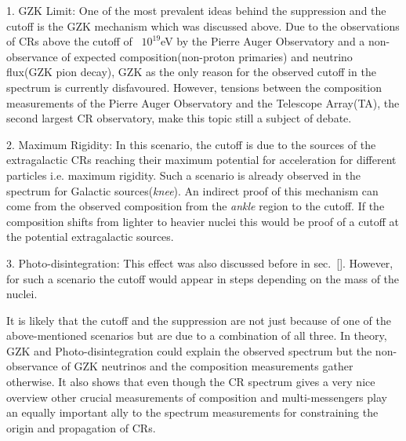 1. GZK Limit: One of the most prevalent ideas behind the suppression and the cutoff is the GZK mechanism which was discussed above. Due to the observations of CRs above the cutoff of ~$10^{19}$eV by the Pierre Auger Observatory and a non-observance of expected composition(non-proton primaries) and neutrino flux(GZK pion decay), GZK as the only reason for the observed cutoff in the spectrum is currently disfavoured. However, tensions between the composition measurements of the Pierre Auger Observatory and the Telescope Array(TA), the second largest CR observatory, make this topic still a subject of debate.

2. Maximum Rigidity: In this scenario, the cutoff is due to the sources of the extragalactic CRs reaching their maximum potential for acceleration for different particles i.e. maximum rigidity. Such a scenario is already observed in the spectrum for Galactic sources(\textit{knee}). An indirect proof of this mechanism can come from the observed composition from the \textit{ankle} region to the cutoff. If the composition shifts from lighter to heavier nuclei this would be proof of a cutoff at the potential extragalactic sources. 

3. Photo-disintegration: This effect was also discussed before in sec.~\ref{}. However, for such a scenario the cutoff would appear in steps depending on the mass of the nuclei. 

It is likely that the cutoff and the suppression are not just because of one of the above-mentioned scenarios but are due to a combination of all three. In theory, GZK and Photo-disintegration could explain the observed spectrum but the non-observance of GZK neutrinos and the composition measurements gather otherwise. It also shows that even though the CR spectrum gives a very nice overview other crucial measurements of composition and multi-messengers play an equally important ally to the spectrum measurements for constraining the origin and propagation of CRs.

